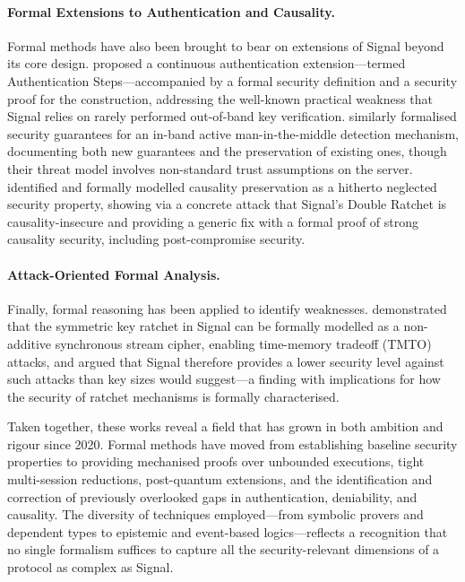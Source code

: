 \paragraph{Formal Extensions to Authentication and Causality.}
Formal methods have also been brought to bear on extensions of Signal beyond its core design. \textcite{dowling2022} proposed a continuous authentication extension—termed Authentication Steps—accompanied by a formal security definition and a security proof for the construction, addressing the well-known practical weakness that Signal relies on rarely performed out-of-band key verification. \textcite{teng2024} similarly formalised security guarantees for an in-band active man-in-the-middle detection mechanism, documenting both new guarantees and the preservation of existing ones, though their threat model involves non-standard trust assumptions on the server. \textcite{chen2024} identified and formally modelled causality preservation as a hitherto neglected security property, showing via a concrete attack that Signal's Double Ratchet is causality-insecure and providing a generic fix with a formal proof of strong causality security, including post-compromise security.

\paragraph{Attack-Oriented Formal Analysis.}
Finally, formal reasoning has been applied to identify weaknesses. \textcite{mattsson2023} demonstrated that the symmetric key ratchet in Signal can be formally modelled as a non-additive synchronous stream cipher, enabling time-memory tradeoff (TMTO) attacks, and argued that Signal therefore provides a lower security level against such attacks than key sizes would suggest—a finding with implications for how the security of ratchet mechanisms is formally characterised.

Taken together, these works reveal a field that has grown in both ambition and rigour since 2020. Formal methods have moved from establishing baseline security properties to providing mechanised proofs over unbounded executions, tight multi-session reductions, post-quantum extensions, and the identification and correction of previously overlooked gaps in authentication, deniability, and causality. The diversity of techniques employed—from symbolic provers and dependent types to epistemic and event-based logics—reflects a recognition that no single formalism suffices to capture all the security-relevant dimensions of a protocol as complex as Signal.

